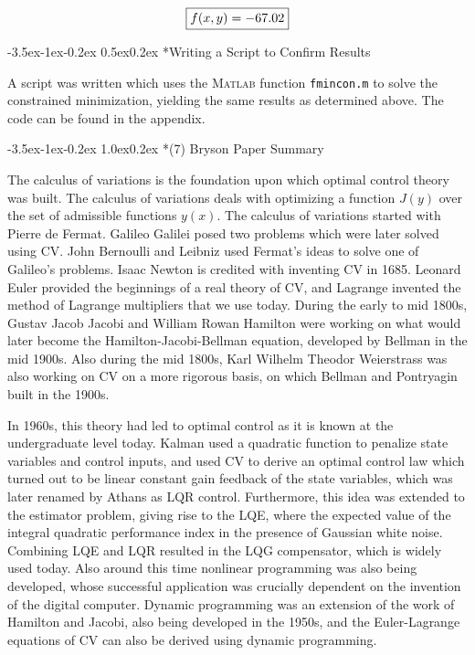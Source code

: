 \documentclass[11pt,letterpaper,onecolumn,notitlepage]{article}
\makeatletter
\renewcommand\section{\@startsection{section}{1}{\z@}%
{-3.5ex\@plus-1ex\@minus-0.2ex}%
{1.0ex\@plus0.2ex}%
{\fontsize{12pt}{12pt}\selectfont\bfseries\sffamily}}
\renewcommand\subsection{\@startsection{subsection}{1}{\z@}%
{-3.5ex\@plus-1ex\@minus-0.2ex}%
{0.5ex\@plus0.2ex}%
{\fontsize{10pt}{10pt}\selectfont\bfseries\sffamily}}
\makeatother
\begin{document}
\begin{equation*}
  \boxed{%
  f(x,y)=-67.02}
\end{equation*}

\subsection*{Writing a Script to Confirm Results}

A script was written which uses the \textsc{Matlab} function \texttt{fmincon.m} to solve the constrained minimization, yielding the same results as determined above.
The code can be found in the appendix.

\section*{(7) Bryson Paper Summary}

The calculus of variations is the foundation upon which optimal control theory was built.
The calculus of variations deals with optimizing a function $J(y)$ over the set of admissible functions $y(x)$.
The calculus of variations started with Pierre de Fermat.
Galileo Galilei posed two problems which were later solved using CV.%
John Bernoulli and Leibniz used Fermat's ideas to solve one of Galileo's problems.
Isaac Newton is credited with inventing CV in 1685.
Leonard Euler provided the beginnings of a real theory of CV, and Lagrange invented the method of Lagrange multipliers that we use today.
During the early to mid 1800s, Gustav Jacob Jacobi and William Rowan Hamilton were working on what would later become the Hamilton-Jacobi-Bellman equation, developed by Bellman in the mid 1900s.
Also during the mid 1800s, Karl Wilhelm Theodor Weierstrass was also working on CV on a more rigorous basis, on which Bellman and Pontryagin built in the 1900s.

In 1960s, this theory had led to optimal control as it is known at the undergraduate level today.
Kalman used a quadratic function to penalize state variables and control inputs, and used CV to derive an optimal control law which turned out to be linear constant gain feedback of the state variables, which was later renamed by Athans as LQR control.
Furthermore, this idea was extended to the estimator problem, giving rise to the LQE, where the expected value of the integral quadratic performance index in the presence of Gaussian white noise.
Combining LQE and LQR resulted in the LQG compensator, which is widely used today.
Also around this time nonlinear programming was also being developed, whose successful application was crucially dependent on the invention of the digital computer.
Dynamic programming was an extension of the work of Hamilton and Jacobi, also being developed in the 1950s, and the Euler-Lagrange equations of CV can also be derived using dynamic programming.
\end{document}
